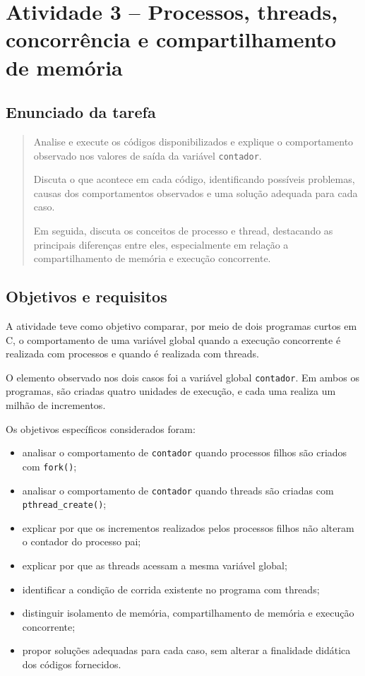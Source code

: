\chapter{Atividade 3 -- Processos, threads, concorrência e compartilhamento de memória}
\label{chap:atvd03}

\section{Enunciado da tarefa}
\label{sec:atvd03-enunciado}

\begin{quote}
Analise e execute os códigos disponibilizados e explique o comportamento observado nos valores de saída da variável \texttt{contador}.

Discuta o que acontece em cada código, identificando possíveis problemas, causas dos comportamentos observados e uma solução adequada para cada caso.

Em seguida, discuta os conceitos de processo e thread, destacando as principais diferenças entre eles, especialmente em relação a compartilhamento de memória e execução concorrente.
\end{quote}

\section{Objetivos e requisitos}
\label{sec:atvd03-objetivos}

A atividade teve como objetivo comparar, por meio de dois programas curtos em C, o comportamento de uma variável global quando a execução concorrente é realizada com processos e quando é realizada com threads.

O elemento observado nos dois casos foi a variável global \texttt{contador}. Em ambos os programas, são criadas quatro unidades de execução, e cada uma realiza um milhão de incrementos.

Os objetivos específicos considerados foram:

\begin{itemize}
    \item analisar o comportamento de \texttt{contador} quando processos filhos são criados com \texttt{fork()};
    \item analisar o comportamento de \texttt{contador} quando threads são criadas com \texttt{pthread\_create()};
    \item explicar por que os incrementos realizados pelos processos filhos não alteram o contador do processo pai;
    \item explicar por que as threads acessam a mesma variável global;
    \item identificar a condição de corrida existente no programa com threads;
    \item distinguir isolamento de memória, compartilhamento de memória e execução concorrente;
    \item propor soluções adequadas para cada caso, sem alterar a finalidade didática dos códigos fornecidos.
\end{itemize}

